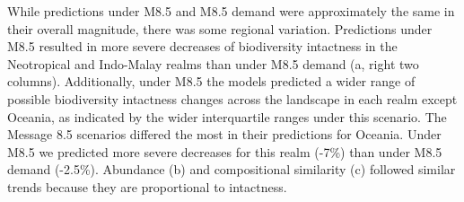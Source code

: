 \documentclass[titlesmallcaps,copyrightpage]{uomthesis}\usepackage[]{graphicx}\usepackage[]{color}
\begin{document}
While predictions under M8.5 and M8.5 demand were approximately the same in their overall magnitude, there was some regional variation. Predictions under M8.5 resulted in more severe decreases of biodiversity intactness in the Neotropical and Indo-Malay realms than under M8.5 demand (a, right two columns). Additionally, under M8.5 the models predicted a wider range of possible biodiversity intactness changes across the landscape in each realm except Oceania, as indicated by the wider interquartile ranges under this scenario. The Message 8.5 scenarios differed the most in their predictions for Oceania. Under M8.5 we predicted more severe decreases for this realm (-7\%) than under M8.5 demand (-2.5\%). Abundance (b) and compositional similarity (c) followed similar trends because they are proportional to intactness.
\end{document}
